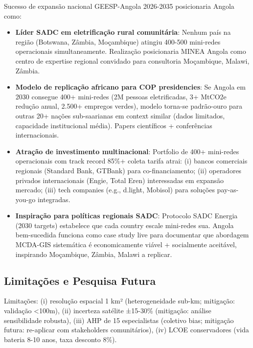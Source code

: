 \documentclass[12pt, a4paper]{article}
\begin{document}
{{{{{{{{{{{{Sucesso de expansão nacional GEESP-Angola 2026-2035 posicionaria Angola como:

\begin{itemize}
\item \textbf{Líder SADC em eletrificação rural comunitária}: Nenhum país na região (Botswana, Zâmbia, Moçambique) atingiu 400-500 mini-redes operacionais simultaneamente. Realização posicionaria MINEA Angola como centro de expertise regional convidado para consultoria Moçambique, Malawi, Zâmbia.

\item \textbf{Modelo de replicação africano para COP presidencies}: Se Angola em 2030 consegue 400+ mini-redes (2M pessoas eletrificadas, 3+ MtCO2e redução anual, 2.500+ empregos verdes), modelo torna-se padrão-ouro para outras 20+ nações sub-saarianas em context similar (dados limitados, capacidade institucional média). Papers científicos + conferências internacionais.

\item \textbf{Atração de investimento multinacional}: Portfolio de 400+ mini-redes operacionais com track record 85\%+ coleta tarifa atrai: (i) bancos comerciais regionais (Standard Bank, GTBank) para co-financiamento; (ii) operadores privados internacionais (Engie, Total Eren) interessadas em expansão mercado; (iii) tech companies (e.g., d.light, Mobisol) para soluções pay-as-you-go integradas.

\item \textbf{Inspiração para políticas regionais SADC}: Protocolo SADC Energia (2030 targets) estabelece que cada country escale mini-redes sua. Angola bem-sucedida funciona como case study live para documentar que abordagem MCDA-GIS sistemática é economicamente viável + socialmente aceitável, inspirando Moçambique, Zâmbia, Malawi a replicar.
\end{itemize}

\subsection{Limitações e Pesquisa Futura}

Limitações: (i) resolução espacial 1 km² (heterogeneidade sub-km; mitigação: validação <100m), (ii) incerteza satélite ±15-30\% (mitigação: análise sensibilidade robusta), (iii) AHP de 15 especialistas (coletivo bias; mitigação futura: re-aplicar com stakeholders comunitários), (iv) LCOE conservadores (vida bateria 8-10 anos, taxa desconto 8\%).

}}}}}}}}}}}}
\end{document}
